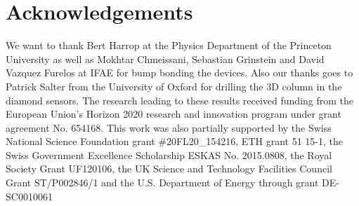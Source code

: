 \section*{Acknowledgements} 
We want to thank Bert Harrop at the Physics Department of the Princeton University as well as Mokhtar Chmeissani, Sebastian Grinstein and David Vazquez Furelos at IFAE for bump bonding the devices. Also our thanks goes to Patrick Salter from the University of Oxford for drilling the 3D column in the diamond sensors. The research leading to these results received funding from the European Union's Horizon 2020 research and innovation program under grant agreement No. 654168. This work was also partially supported by the Swiss National Science Foundation grant \#20FL20\_154216, ETH grant 51 15-1, the  Swiss Government Excellence Scholarship ESKAS No. 2015.0808, the Royal Society Grant UF120106, the UK Science and Technology Facilities Council Grant ST/P002846/1 and the U.S. Department of Energy through grant DE-SC0010061
